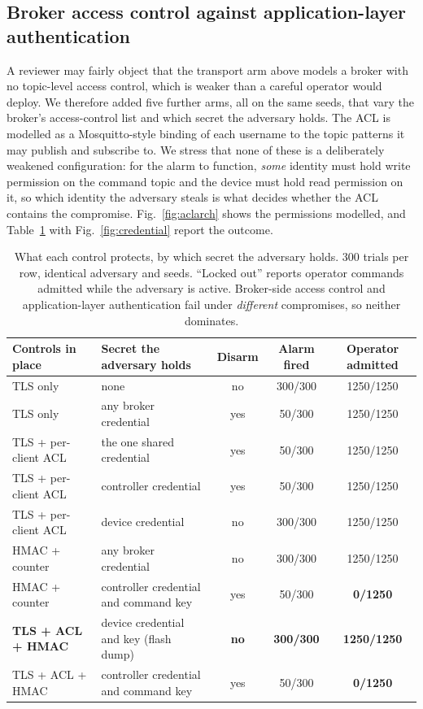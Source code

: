 \subsection{Broker access control against application-layer authentication}
\label{sec:acl}

A reviewer may fairly object that the transport arm above models a broker with no topic-level
access control, which is weaker than a careful operator would deploy. We therefore added five
further arms, all on the same seeds, that vary the broker's access-control list and which
secret the adversary holds. The ACL is modelled as a Mosquitto-style binding of each username
to the topic patterns it may publish and subscribe to. We stress that none of these is a
deliberately weakened configuration: for the alarm to function, \emph{some} identity must hold
write permission on the command topic and the device must hold read permission on it, so which
identity the adversary steals is what decides whether the ACL contains the compromise.
Fig.~\ref{fig:aclarch} shows the permissions modelled, and Table~\ref{tab:credential} with
Fig.~\ref{fig:credential} report the outcome.

\begin{table}[t]
\centering\small
\caption{What each control protects, by which secret the adversary holds. 300 trials per row,
identical adversary and seeds. ``Locked out'' reports operator commands admitted while the
adversary is active. Broker-side access control and application-layer authentication fail under
\emph{different} compromises, so neither dominates.}
\label{tab:credential}
\begin{tabular}{@{}llccc@{}}
\toprule
Controls in place & Secret the adversary holds & Disarm & Alarm fired & Operator admitted \\
\midrule
TLS only            & none                                  & no  & 300/300 & 1250/1250 \\
TLS only            & any broker credential                 & yes & 50/300  & 1250/1250 \\
TLS + per-client ACL& the one shared credential             & yes & 50/300  & 1250/1250 \\
TLS + per-client ACL& controller credential                 & yes & 50/300  & 1250/1250 \\
TLS + per-client ACL& device credential                     & no  & 300/300 & 1250/1250 \\
HMAC + counter      & any broker credential                 & no  & 300/300 & 1250/1250 \\
HMAC + counter      & controller credential and command key & yes & 50/300  & \textbf{0/1250} \\
\textbf{TLS + ACL + HMAC} & device credential and key (flash dump) & \textbf{no} & \textbf{300/300} & \textbf{1250/1250} \\
TLS + ACL + HMAC & controller credential and command key & yes & 50/300 & \textbf{0/1250} \\
\bottomrule
\end{tabular}
\end{table}

